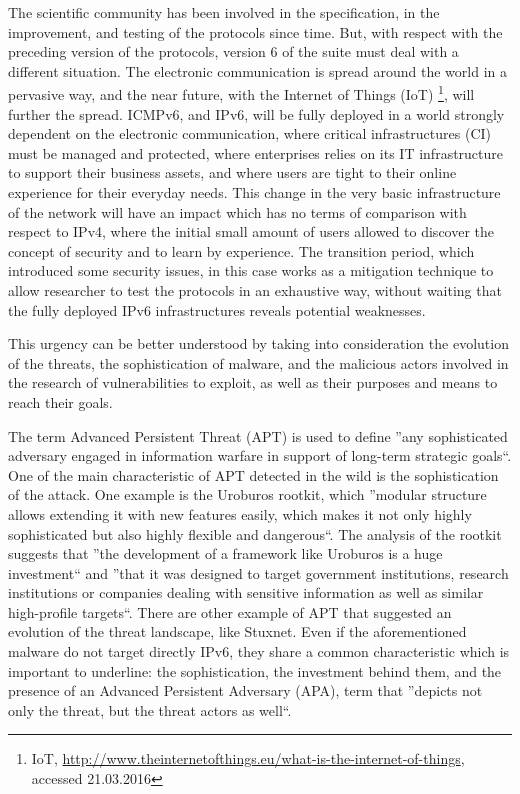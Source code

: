 \documentclass[12pt]{article}
\begin{document}
The scientific community has been involved in the specification, in the improvement, and testing of the protocols since time. But, with respect with the preceding version of the protocols, version 6 of the suite must deal with a different situation. The electronic communication is spread around the world in a pervasive way, and the near future, with the Internet of Things (IoT) \footnote{IoT, \url{http://www.theinternetofthings.eu/what-is-the-internet-of-things}, accessed 21.03.2016}, will further the spread. ICMPv6, and IPv6, will be fully deployed in a world strongly dependent on the electronic communication, where critical infrastructures (CI) must be managed and protected, where enterprises relies on its IT infrastructure to support their business assets, and where users are tight to their online experience for their everyday needs. This change in the very basic infrastructure of the network will have an impact which has no terms of comparison with respect to IPv4, where the initial small amount of users allowed to discover the concept of security and to learn by experience. The transition period, which introduced some security issues, in this case works as a mitigation technique to allow researcher to test the protocols in an exhaustive way, without waiting that the fully deployed IPv6 infrastructures reveals potential weaknesses.

This urgency can be better understood by taking into consideration the evolution of the threats, the sophistication of malware, and the malicious actors involved in the research of vulnerabilities to exploit, as well as their purposes and means to reach their goals.

The term Advanced Persistent Threat (APT) is used to define ''any sophisticated adversary engaged in information warfare in support of long-term strategic goals``\cite{apt}. One of the main characteristic of APT detected in the wild is the sophistication of the attack. One example is the Uroburos rootkit\cite{uroburos}, which ''modular structure allows extending it with new features easily, which makes it not only highly sophisticated but also highly flexible and dangerous``. The analysis of the rootkit suggests that ''the development of a framework like Uroburos is a huge investment`` and ''that it was designed to target government institutions, research institutions or companies dealing with sensitive information as well as similar high-profile targets``. There are other example of APT that suggested an evolution of the threat landscape, like Stuxnet\cite{stuxnet}. Even if the aforementioned malware do not target directly IPv6, they share a common characteristic which is important to underline: the sophistication, the investment behind them, and the presence of an Advanced Persistent Adversary (APA), term that ''depicts not only the threat, but the threat actors as well``\cite{apa}.
\end{document}
